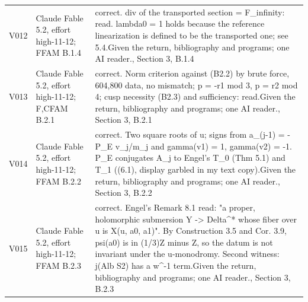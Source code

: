 \documentclass[11pt,a4paper]{article}
\theoremstyle{plain}
\theoremstyle{definition}
\begin{document}
\begin{longtable}{@{}L{.08\linewidth}L{.31\linewidth}L{.56\linewidth}@{}}
V012 & Claude Fable 5.2, effort high-11-12; F\newline FAM B.1.4 & correct. div of the transported section = F\_\allowbreak{}infinity:\allowbreak{} read. lambda0 = 1 holds because the reference linearization is defined to be the transported one; see 5.4.\newline Given the return, bibliography and programs; one AI reader.\newline {}, Section 3, B.1.4\\
V013 & Claude Fable 5.2, effort high-11-12; F,C\newline FAM B.2.1 & correct. Norm criterion against (B2.2) by brute force, 604,800 data, no mismatch; p = -r1 mod 3, p = r2 mod 4; cusp necessity (B2.3) and sufficiency:\allowbreak{} read.\newline Given the return, bibliography and programs; one AI reader.\newline {}, Section 3, B.2.1\\
V014 & Claude Fable 5.2, effort high-11-12; F\newline FAM B.2.2 & correct. Two square roots of u; signs from a\_\allowbreak{}(j-1) = -P\_\allowbreak{}E v\_\allowbreak{}j/\allowbreak{}m\_\allowbreak{}j and gamma(v1) = 1, gamma(v2) = -1. P\_\allowbreak{}E conjugates A\_\allowbreak{}j to Engel's T\_\allowbreak{}0 (Thm 5.1) and T\_\allowbreak{}1 ((6.1), display garbled in my text copy).\newline Given the return, bibliography and programs; one AI reader.\newline {}, Section 3, B.2.2\\
V015 & Claude Fable 5.2, effort high-11-12; F\newline FAM B.2.3 & correct. Engel's Remark 8.1 read:\allowbreak{} "a proper, holomorphic submersion Y -> Delta\textasciicircum{}* whose fiber over u is X(u, a0, a1)". By Construction 3.5 and Cor. 3.9, psi(a0) is in (1/\allowbreak{}3)Z minus Z, so the datum is not invariant under the u-monodromy. Second witness:\allowbreak{} j(Alb S2) has a w\textasciicircum{}-1 term.\newline Given the return, bibliography and programs; one AI reader.\newline {}, Section 3, B.2.3\\

\end{longtable}
\end{document}
